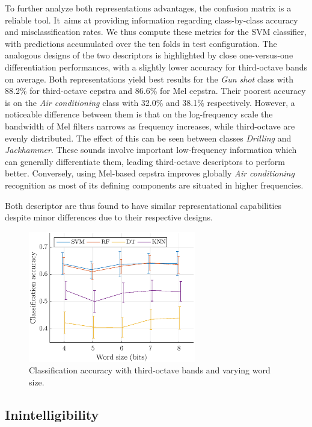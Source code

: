 \documentclass[sensors,article,accept,moreauthors,pdftex,10pt,a4paper]{mdpi}
\begin{document}
To further analyze both representations advantages, the confusion matrix is a reliable tool. It~aims at providing information regarding class-by-class accuracy and misclassification rates. We thus compute these metrics for the SVM classifier, with predictions accumulated over the ten folds in test configuration. The analogous designs of the two descriptors is highlighted by close one-versus-one differentiation performances, with a slightly lower accuracy for third-octave bands on average. Both representations yield best results for the \textit{Gun shot} class with 88.2\% for third-octave cepstra and 86.6\% for Mel cepstra. Their poorest accuracy is on the \textit{Air conditioning} class with 32.0\% and 38.1\% respectively. However, a noticeable difference between them is that on the log-frequency scale the bandwidth of Mel filters narrows as frequency increases, while third-octave are evenly distributed. The effect of this can be seen between classes \textit{Drilling} and \textit{Jackhammer}. These sounds involve important low-frequency information which can generally differentiate them, leading third-octave descriptors to perform better. Conversely, using Mel-based cepstra improves globally \textit{Air conditioning} recognition as most of its defining components are situated in higher frequencies.

Both descriptor are thus found to have similar representational capabilities despite minor differences due to their respective designs.

\begin{figure}[H]
	\centering
		\includegraphics[width=0.65\textwidth]{figures/class_tob_q.eps}
	\caption{Classification accuracy with third-octave bands and varying word size.}
	\label{fig:class_tob_q}
\end{figure}


\subsection{Inintelligibility} \label{sec:inintelligibility_r}
\end{document}
